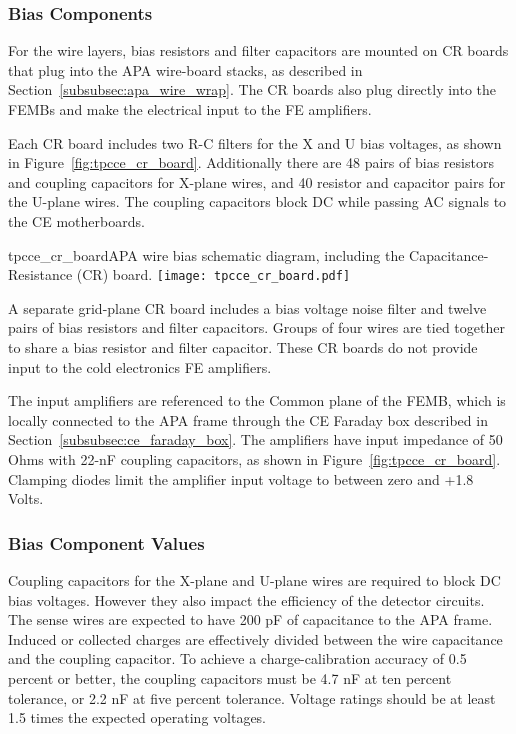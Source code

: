 \subsubsection{Bias Components}
\label{subsec:ce_bias_comp}

For the wire layers, bias resistors and filter capacitors are mounted on CR boards that plug 
into the APA wire-board stacks, as described in Section~\ref{subsubsec:apa_wire_wrap}. The CR boards 
also plug directly into the FEMBs and make the electrical input to the FE amplifiers.

Each CR board includes two R-C filters for the X and U bias voltages, as shown 
in Figure~\ref{fig:tpcce_cr_board}. Additionally there are 48 
pairs of bias resistors and coupling capacitors for X-plane wires, and 40 resistor and 
capacitor pairs for the U-plane wires. The coupling capacitors block DC while passing AC 
signals to the CE motherboards.

\begin{cdrfigure}{tpcce_cr_board}{APA wire bias 
schematic diagram, including the Capacitance-Resistance (CR) board.}
\texttt{[image: tpcce\_cr\_board.pdf]}
\end{cdrfigure}

A separate grid-plane CR board includes a bias voltage noise filter and twelve pairs of 
bias resistors and filter capacitors. Groups of four wires are tied together to share a 
bias resistor and filter capacitor. These CR boards do not provide input to the cold
electronics FE amplifiers.

The input amplifiers are referenced to the Common plane of the FEMB, which is locally connected 
to the APA frame through the CE Faraday box described in Section~\ref{subsubsec:ce_faraday_box}. The amplifiers 
have input impedance of 50 Ohms with 22-nF coupling capacitors, as shown in Figure~\ref{fig:tpcce_cr_board}. 
Clamping diodes limit the amplifier input voltage to between zero and +1.8 Volts.

\subsubsection{Bias Component Values}
\label{subsec:bias_comp_values}

Coupling capacitors for the X-plane and U-plane wires are required to block DC bias voltages.
However they also impact the efficiency of the detector circuits.
The sense wires are expected to have 200 pF of capacitance to the APA frame.
Induced or collected charges are effectively divided between the wire capacitance and the coupling capacitor.
To achieve a charge-calibration accuracy of 0.5 percent or better,
the coupling capacitors must be 4.7 nF at ten percent tolerance, or 2.2 nF at five percent tolerance.
Voltage ratings should be at least 1.5 times the expected operating voltages.

